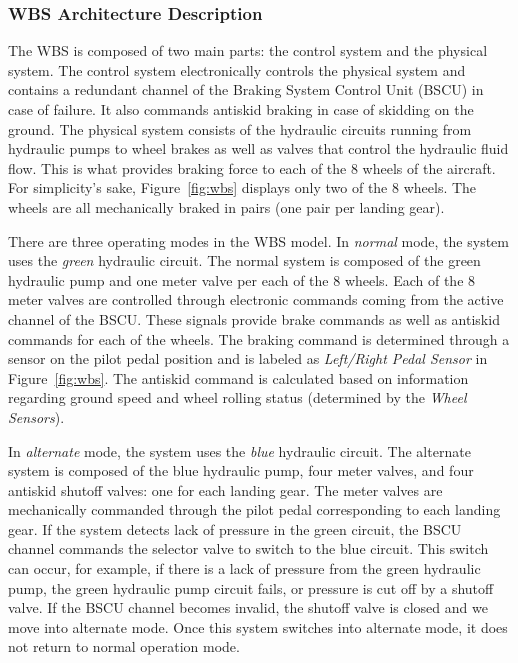 \subsubsection{WBS Architecture Description}
The WBS is composed of two main parts: the control system and the physical system. The control system electronically controls the physical system and contains a redundant channel of the Braking System Control Unit (BSCU) in case of failure. It also commands antiskid braking in case of skidding on the ground. The physical system consists of the hydraulic circuits running from hydraulic pumps to wheel brakes as well as valves that control the hydraulic fluid flow. This is what provides braking force to each of the 8 wheels of the aircraft. For simplicity's sake, Figure~\ref{fig:wbs} displays only two of the 8 wheels. The wheels are all mechanically braked in pairs (one pair per landing gear). 

There are three operating modes in the WBS model. In \textit{normal} mode, the system uses the \textit{green} hydraulic circuit. The normal system is composed of the green hydraulic pump and one meter valve per each of the 8 wheels. Each of the 8 meter valves are controlled through electronic commands coming from the active channel of the BSCU. These signals provide brake commands as well as antiskid commands for each of the wheels. The braking command is determined through a sensor on the pilot pedal position and is labeled as \textit{Left/Right Pedal Sensor} in Figure~\ref{fig:wbs}. The antiskid command is calculated based on information regarding ground speed and wheel rolling status (determined by the \textit{Wheel Sensors}). 

In \textit{alternate} mode, the system uses the \textit{blue} hydraulic circuit. The alternate system is composed of the blue hydraulic pump, four meter valves, and four antiskid shutoff valves: one for each landing gear. The meter valves are mechanically commanded through the pilot pedal corresponding to each landing gear. If the system detects lack of pressure in the green circuit, the BSCU channel commands the selector valve to switch to the blue circuit. This switch can occur, for example, if there is a lack of pressure from the green hydraulic pump, the green hydraulic pump circuit fails, or pressure is cut off by a shutoff valve. If the BSCU channel becomes invalid, the shutoff valve is closed and we move into alternate mode. Once this system switches into alternate mode, it does not return to normal operation mode.

